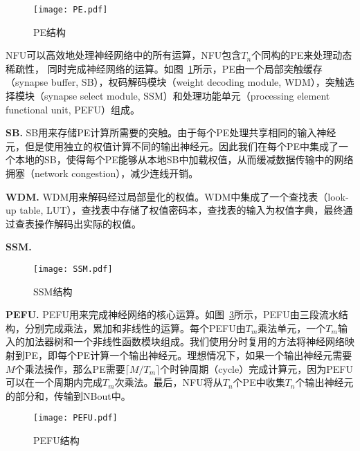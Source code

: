 \begin{figure}[h]
\centering
\texttt{[image: PE.pdf]}
\caption{PE结构}
\label{fig:PE}
\end{figure}

NFU可以高效地处理神经网络中的所有运算，NFU包含$T_n$个同构的PE来处理动态稀疏性， 同时完成神经网络的运算。如图~\ref{fig:PE}所示，PE由一个局部突触缓存（synapse buffer, SB），权码解码模块（weight decoding module, WDM），突触选择模块（synapse select module, SSM）和处理功能单元（processing element functional unit, PEFU）组成。

\textbf{SB.} SB用来存储PE计算所需要的突触。由于每个PE处理共享相同的输入神经元，但是使用独立的权值计算不同的输出神经元。因此我们在每个PE中集成了一个本地的SB，使得每个PE能够从本地SB中加载权值，从而缓减数据传输中的网络拥塞（network congestion），减少连线开销。

\textbf{WDM.} WDM用来解码经过局部量化的权值。WDM中集成了一个查找表（look-up table, LUT），查找表中存储了权值密码本，查找表的输入为权值字典，最终通过查表操作解码出实际的权值。

\textbf{SSM.} 

\begin{figure}[h]
\centering
\texttt{[image: SSM.pdf]}
\caption{SSM结构}
\label{fig:SSM}
\end{figure}

\textbf{PEFU.} PEFU用来完成神经网络的核心运算。如图~\ref{fig:PEFU}所示，PEFU由三段流水结构，分别完成乘法，累加和非线性的运算。每个PEFU由$T_m$乘法单元，一个$T_m$输入的加法器树和一个非线性函数模块组成。我们使用分时复用的方法将神经网络映射到PE，即每个PE计算一个输出神经元。理想情况下，如果一个输出神经元需要$M$个乘法操作，那么PE需要$\lceil M/T_{m} \rceil$个时钟周期（cycle）完成计算元，因为PEFU可以在一个周期内完成$T_m$次乘法。最后，NFU将从$T_n$个PE中收集$T_n$个输出神经元的部分和，传输到NBout中。 

\begin{figure}[h]
\centering
\texttt{[image: PEFU.pdf]}
\caption{PEFU结构}
\label{fig:PEFU}
\end{figure}


